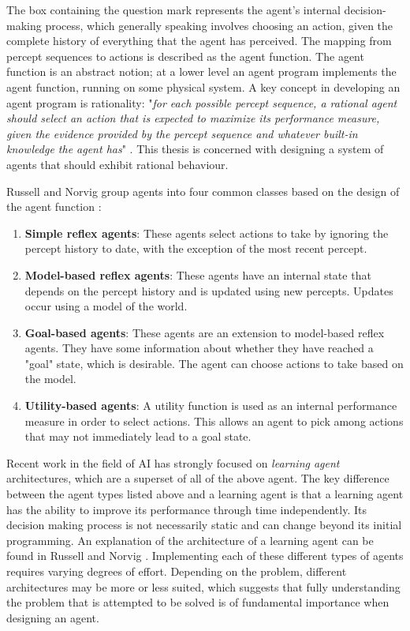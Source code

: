 The box containing the question mark represents the agent's internal decision-making process, which generally speaking involves choosing an action, given the complete history of everything that the agent has perceived. The mapping from percept sequences to actions is described as the agent function. The agent function is an abstract notion; at a lower level an agent program implements the agent function, running on some physical system. A key concept in developing an agent program is rationality: "\textit{for each possible percept sequence, a rational agent should select an action that is expected to maximize its performance measure, given the evidence provided by the percept sequence and whatever built-in knowledge the agent has}" \cite[p.~37]{AIAMA}. This thesis is concerned with designing a system of agents that should exhibit rational behaviour.\newline
 

Russell and Norvig group agents into four common classes based on the design of the agent function \cite[p.~47]{AIAMA}: 
\begin{enumerate}
    \item \textbf{Simple reflex agents}: These agents select actions to take by ignoring the percept history to date, with the exception of the most recent percept.
    \item \textbf{Model-based reflex agents}: These agents have an internal state that depends on the percept history and is updated using new percepts. Updates occur using a model of the world.
    \item \textbf{Goal-based agents}: These agents are an extension to model-based reflex agents. They have some information about whether they have reached a "goal" state, which is desirable. The agent can choose actions to take based on the model. 
    \item \textbf{Utility-based agents}: A utility function is used as an internal performance measure in order to select actions. This allows an agent to pick among actions that may not immediately lead to a goal state.
\end{enumerate}
Recent work in the field of AI has strongly focused on \textit{learning agent} architectures, which are a superset of all of the above agent. The key difference between the agent types listed above and a learning agent is that a learning agent has the ability to improve its performance through time independently. Its decision making process is not necessarily static and can change beyond its initial programming. An explanation of the architecture of a learning agent can be found in Russell and Norvig \cite[p.~55]{AIAMA}. Implementing each of these different types of agents requires varying degrees of effort. Depending on the problem, different architectures may be more or less suited, which suggests that fully understanding the problem that is attempted to be solved is of fundamental importance when designing an agent.

